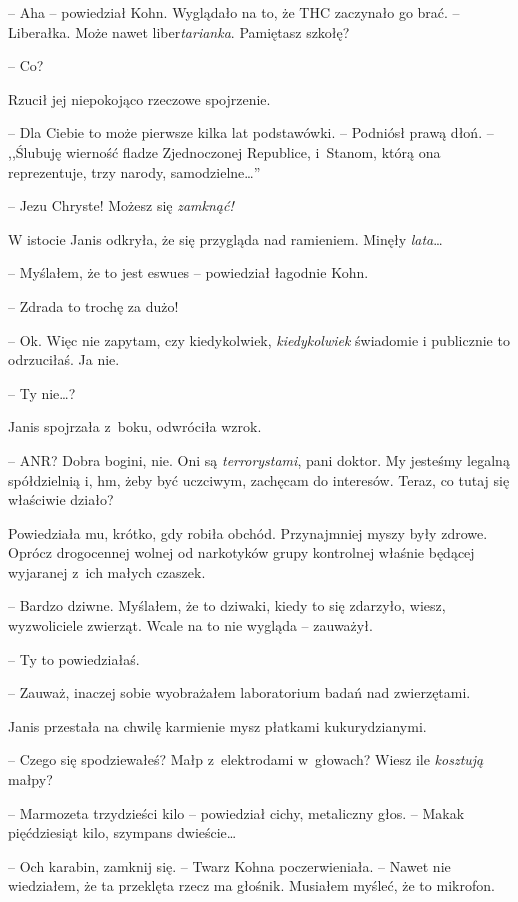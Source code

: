 \documentclass[oneside,polish,11pt,sfheadings]{mwbk}
\let\footnote=\endnote
\begin{document}
-- Aha -- powiedział Kohn. Wyglądało na to, że THC zaczynało go brać. --
Liberałka. Może nawet liber\emph{tarianka}. Pamiętasz szkołę?

-- Co?

Rzucił jej niepokojąco rzeczowe spojrzenie.

-- Dla Ciebie to może pierwsze kilka lat podstawówki. -- Podniósł prawą
dłoń. -- ,,Ślubuję wierność fladze Zjednoczonej Republice, i~Stanom, którą
ona reprezentuje, trzy narody, samodzielne\ldots''

-- Jezu Chryste! Możesz się \emph{zamknąć!}

W istocie Janis odkryła, że się przygląda nad ramieniem. Minęły
\emph{lata}\ldots

-- Myślałem, że to jest eswues\footnote{SWS -- Strefa Wolności Słowa -- przyp.tłum.} -- powiedział łagodnie Kohn.

-- Zdrada to trochę za dużo!

-- Ok. Więc nie zapytam, czy kiedykolwiek, \emph{kiedykolwiek} świadomie
i publicznie to odrzuciłaś. Ja nie.

-- Ty nie\ldots?

Janis spojrzała z~boku, odwróciła wzrok.

-- ANR? Dobra bogini, nie. Oni są \emph{terrorystami}, pani doktor. My
jesteśmy legalną spółdzielnią i, hm, żeby być uczciwym, zachęcam do
interesów. Teraz, co tutaj się właściwie działo?

Powiedziała mu, krótko, gdy robiła obchód. Przynajmniej myszy były
zdrowe. Oprócz drogocennej wolnej od narkotyków grupy kontrolnej właśnie
będącej wyjaranej z~ich małych czaszek.

-- Bardzo dziwne. Myślałem, że to dziwaki, kiedy to się zdarzyło, wiesz,
wyzwoliciele zwierząt. Wcale na to nie wygląda -- zauważył.

-- Ty to powiedziałaś.

-- Zauważ, inaczej sobie wyobrażałem laboratorium badań nad zwierzętami.

Janis przestała na chwilę karmienie mysz płatkami kukurydzianymi.

-- Czego się spodziewałeś? Małp z~elektrodami w~głowach? Wiesz ile
\emph{kosztują} małpy?

-- Marmozeta trzydzieści kilo -- powiedział cichy, metaliczny głos. -- Makak pięćdziesiąt kilo, szympans dwieście\ldots

-- Och karabin, zamknij się. -- Twarz Kohna poczerwieniała. -- Nawet nie
wiedziałem, że ta przeklęta rzecz ma głośnik. Musiałem myśleć, że to
mikrofon.
\end{document}
